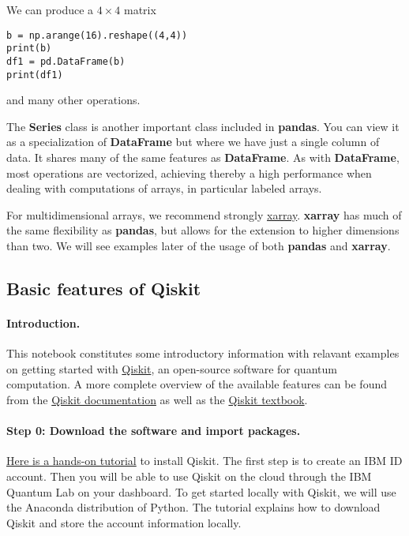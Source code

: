 \documentclass[%
oneside,                 %
final,                   %
10pt]{article}
\begin{document}
We can produce a $4\times 4$ matrix





\begin{verbatim}
b = np.arange(16).reshape((4,4))
print(b)
df1 = pd.DataFrame(b)
print(df1)

\end{verbatim}

and many other operations. 

The \textbf{Series} class is another important class included in
\textbf{pandas}. You can view it as a specialization of \textbf{DataFrame} but where
we have just a single column of data. It shares many of the same features as \textbf{DataFrame}. As with \textbf{DataFrame},
most operations are vectorized, achieving thereby a high performance when dealing with computations of arrays, in particular labeled arrays.

For multidimensional arrays, we recommend strongly \href{{http://xarray.pydata.org/en/stable/}}{xarray}. \textbf{xarray} has much of the same flexibility as \textbf{pandas}, but allows for the extension to higher dimensions than two. We will see examples later of the usage of both \textbf{pandas} and \textbf{xarray}. 

\subsection*{Basic features of Qiskit}

\paragraph{Introduction.}
This notebook constitutes some introductory information with relavant
examples on getting started with \href{{https://qiskit.org/}}{Qiskit}, an
open-source software for quantum computation. A more complete overview
of the available features can be found from the \href{{https://qiskit.org/documentation/tutorials.html}}{Qiskit documentation} as
well as the \href{{https://qiskit.org/textbook/preface.html}}{Qiskit textbook}.

\paragraph{Step 0: Download the software and import packages.}
\href{{https://www.youtube.com/watch?v=1kRfHNUbkrg&t=163s}}{Here is a hands-on tutorial} to install Qiskit.
The first step is to create an IBM ID account. Then you will be able
to use Qiskit on the cloud through the IBM Quantum Lab on your
dashboard. To get started locally with Qiskit, we will use the
Anaconda distribution of Python. The tutorial explains how to download
Qiskit and store the account information locally.
\end{document}
